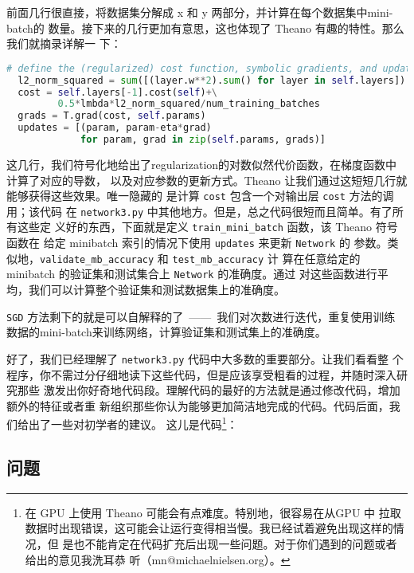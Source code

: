 前面几行很直接，将数据集分解成 x 和 y 两部分，并计算在每个数据集中\gls*{mini-batch}的
数量。接下来的几行更加有意思，这也体现了 Theano 有趣的特性。那么我们就摘录详解一
下：

\begin{lstlisting}[language=Python]
  # define the (regularized) cost function, symbolic gradients, and updates
  l2_norm_squared = sum([(layer.w**2).sum() for layer in self.layers])
  cost = self.layers[-1].cost(self)+\
         0.5*lmbda*l2_norm_squared/num_training_batches
  grads = T.grad(cost, self.params)
  updates = [(param, param-eta*grad) 
             for param, grad in zip(self.params, grads)]
\end{lstlisting}

这几行，我们符号化地给出了\gls*{regularization}的对数似然代价函数，在梯度函数中计算了对应的导数，
以及对应参数的更新方式。Theano 让我们通过这短短几行就能够获得这些效果。唯一隐藏的
是计算 \lstinline!cost! 包含一个对输出层 \lstinline!cost! 方法的调用；该代码
在 \lstinline!network3.py! 中其他地方。但是，总之代码很短而且简单。有了所有这些定
义好的东西，下面就是定义 \lstinline!train_mini_batch! 函数，该 Theano 符号函数在
给定 minibatch 索引的情况下使用 \lstinline!updates! 来更新 \lstinline!Network! 的
参数。类似地，\lstinline!validate_mb_accuracy! 和 \lstinline!test_mb_accuracy! 计
算在任意给定的 minibatch 的验证集和测试集合上 \lstinline!Network! 的准确度。通过
对这些函数进行平均，我们可以计算整个验证集和测试数据集上的准确度。

\lstinline!SGD! 方法剩下的就是可以自解释的了~——~我们对次数进行迭代，重复使用训练
数据的\gls*{mini-batch}来训练网络，计算验证集和测试集上的准确度。

好了，我们已经理解了 \lstinline!network3.py! 代码中大多数的重要部分。让我们看看整
个程序，你不需过分仔细地读下这些代码，但是应该享受粗看的过程，并随时深入研究那些
激发出你好奇地代码段。理解代码的最好的方法就是通过修改代码，增加额外的特征或者重
新组织那些你认为能够更加简洁地完成的代码。代码后面，我们给出了一些对初学者的建议。
这儿是代码\footnote{在 GPU 上使用 Theano 可能会有点难度。特别地，很容易在从GPU 中
  拉取数据时出现错误，这可能会让运行变得相当慢。我已经试着避免出现这样的情况，但
  是也不能肯定在代码扩充后出现一些问题。对于你们遇到的问题或者给出的意见我洗耳恭
  听（mn@michaelnielsen.org）。}：



\subsection*{问题}

